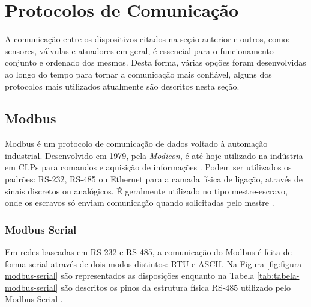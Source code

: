        \begin{figure}[!h]
	    \end{figure}
      

    \section{Protocolos de Comunicação}
    \label{sec:protocolos}
    A comunicação entre os dispositivos citados na seção anterior e outros, como: sensores, válvulas e atuadores em geral, é essencial para o funcionamento conjunto e ordenado dos mesmos. Desta forma, várias opções foram desenvolvidas ao longo do tempo para tornar a comunicação mais confiável, alguns dos protocolos mais utilizados atualmente são descritos nesta seção.
    
    \subsection{Modbus}
    \label{sec:modbus}
    
    Modbus é um protocolo de comunicação de dados voltado à automação industrial. Desenvolvido em 1979, pela \textit{Modicon}, é até hoje utilizado na indústria em \glspl{CLP} para comandos e aquisição de informações \cite{CLPManual}. Podem ser utilizados os padrões: RS-232, RS-485 ou Ethernet para a camada física de ligação, através de sinais discretos ou analógicos. É geralmente utilizado no tipo mestre-escravo, onde os escravos só enviam comunicação quando solicitadas pelo mestre  \cite{Modbus}.
    
    \subsubsection{Modbus Serial}
    \label{sec:modbus-serial}

        Em redes baseadas em RS-232 e RS-485, a comunicação do Modbus é feita de forma serial através de dois modos distintos: \gls{RTU} e \gls{ASCII}. Na Figura \ref{fig:figura-modbus-serial} são representados as disposições enquanto na Tabela \ref{tab:tabela-modbus-serial} são descritos os pinos da estrutura física RS-485 utilizado pelo Modbus Serial \cite{Modbus}.
        
